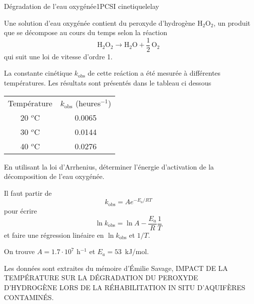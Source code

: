 \begin{exercise}{Dégradation de l'eau oxygénée}{1}{PCSI}
{cinetique}{lelay}

Une solution d'eau oxygénée contient du peroxyde d'hydrogène H$_2$O$_2$, un produit que se décompose au cours du temps selon la réaction
$$
\text{H}_2\text{O}_2 \longrightarrow \text{H}_2 \text{O} + \frac12\, \text{O}_2
$$
qui suit une loi de vitesse d'ordre 1.

La constante cinétique $k_\text{obs}$ de cette reáction a été mesurée à différentes températures. Les résultats sont présentés dans le tableau ci dessous

\begin{table}[H]
    \centering
    \begin{tabular}{c|c}
        Température & $k_\text{obs}$ (heures$^{-1}$) \\
        20 $^o$C &  0.0065 \\
        30 $^o$C &  0.0144 \\
        40 $^o$C &  0.0276 
    \end{tabular}
\end{table}

\begin{questions}

    \question En utilisant la loi d'Arrhenius, déterminer l'énergie d'activation de la décomposition de l'eau oxygénée. 
    
\end{questions}
\end{exercise}

\begin{solution}
\begin{questions}

    \question Il faut partir de $$k_\text{obs} = A e^{-E_a/RT}$$ pour écrire
    $$
    \ln k_\text{obs} = \ln A - \frac{E_a}{R} \frac{1}{T}
    $$ et faire une régression linéaire en $\ln k_\text{obs}$ et $1/T$.
    
    On trouve $A = 1.7 \cdot 10^7$ h$^{-1}$ et $E_a = 53$~kJ/mol.
    
\end{questions}
Les données sont extraites du mémoire d'Émilie Savage, IMPACT DE LA TEMPÉRATURE SUR LA DÉGRADATION DU PEROXYDE D’HYDROGÈNE LORS DE LA RÉHABILITATION IN SITU D’AQUIFÈRES CONTAMINÉS.
\end{solution}
